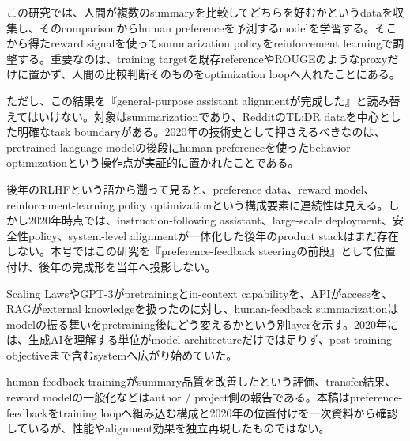 
この研究では、人間が複数のsummaryを比較してどちらを好むかというdataを収集し、そのcomparisonからhuman preferenceを予測するmodelを学習する。そこから得たreward signalを使ってsummarization policyをreinforcement learningで調整する。重要なのは、training targetを既存referenceやROUGEのようなproxyだけに置かず、人間の比較判断そのものをoptimization loopへ入れたことにある。\autocite{src-8622fc1e22c2,src-e5838d162a66}


ただし、この結果を『general-purpose assistant alignmentが完成した』と読み替えてはいけない。対象はsummarizationであり、RedditのTL;DR dataを中心とした明確なtask boundaryがある。2020年の技術史として押さえるべきなのは、pretrained language modelの後段にhuman preferenceを使ったbehavior optimizationという操作点が実証的に置かれたことである。\autocite{src-8622fc1e22c2,src-e5838d162a66}


後年のRLHFという語から遡って見ると、preference data、reward model、reinforcement-learning policy optimizationという構成要素に連続性は見える。しかし2020年時点では、instruction-following assistant、large-scale deployment、安全性policy、system-level alignmentが一体化した後年のproduct stackはまだ存在しない。本号ではこの研究を『preference-feedback steeringの前段』として位置付け、後年の完成形を当年へ投影しない。\autocite{src-8622fc1e22c2,src-e5838d162a66}


Scaling LawsやGPT-3がpretrainingとin-context capabilityを、APIがaccessを、RAGがexternal knowledgeを扱ったのに対し、human-feedback summarizationはmodelの振る舞いをpretraining後にどう変えるかという別layerを示す。2020年には、生成AIを理解する単位がmodel architectureだけでは足りず、post-training objectiveまで含むsystemへ広がり始めていた。\autocite{src-8622fc1e22c2,src-e5838d162a66}


\begin{claimboundary}
human-feedback trainingがsummary品質を改善したという評価、transfer結果、reward modelの一般化などはauthor / project側の報告である。本稿はpreference-feedbackをtraining loopへ組み込む構成と2020年の位置付けを一次資料から確認しているが、性能やalignment効果を独立再現したものではない。\autocite{src-8622fc1e22c2,src-e5838d162a66}
\end{claimboundary}
